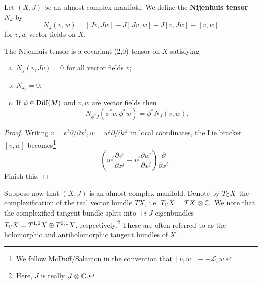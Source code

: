 \documentclass{amsart}
\begin{document}
\begin{definition}
    Let $(X,J)$ be an almost complex manifold. We define the \textbf{Nijenhuis tensor} $N_J$ by
    \begin{equation*}
        N_J(v,w) = [Jv,Jw] - J[Jv,w] - J[v,Jw] - [v,w]
    \end{equation*}
    for $v,w$ vector fields on $X$.
\end{definition}

\begin{lemma}
    The Nijenhuis tensor is a covariant (2,0)-tensor on $X$ satisfying
    \begin{enumerate}[(a)]
        \item $N_J(v,Jv)=0$ for all vector fields $v$;
        \item $N_{J_0}=0$;
        \item If $\phi\in\operatorname{Diff}(M)$ and $v,w$ are vector fields then
            \begin{equation*}
                N_{\phi^*J}(\phi^*v,\phi^*w) = \phi^*N_J(v,w).
            \end{equation*}
    \end{enumerate}
\end{lemma}
\begin{proof}
    Writing $v=v^i\partial/\partial x^i, w=w^i\partial/\partial x^i$ in local coordinates,
    the Lie bracket $[v,w]$ becomes\footnote{We follow McDuff/Salamon in the convention that
        $[v,w]\equiv-\mathcal{L}_vw$.}
    \begin{equation*}
        [v,w] = \left( w^j\frac{\partial v^i}{\partial x^j} - v^j\frac{\partial w^i}{\partial x^j} \right)\frac{\partial}{\partial x^i}.
    \end{equation*}
    Finish this.
\end{proof}

Suppose now that $(X,J)$ is an almost complex manifold. Denote by $T_{\mathbb{C}} X$ the complexification
of the real vector bundle $TX$, i.e. $T_{\mathbb{C}} X=TX\otimes\mathbb{C}$. We note that the complexified
tangent bundle splits into $\pm i$ $J$-eigenbundles $T_{\mathbb{C}} X = T^{1,0}X\oplus T^{0,1}X$,
respectively.\footnote{Here, $J$ is really $J\otimes\mathbb{C}$.} These are often referred to as the
holomorphic and antiholomorphic tangent bundles of $X$.
\end{document}
